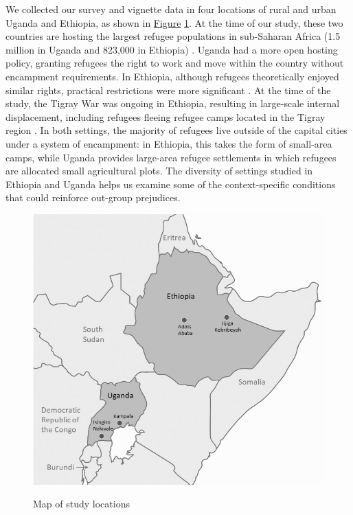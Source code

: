 \documentclass[a4paper,12pt]{article}
\renewcommand{\footnotesize}{\fontsize{8pt}{9pt}\selectfont}
\begin{document}
We collected our survey and vignette data in four locations of rural and urban Uganda and Ethiopia, as shown in \hyperref[fig:map]{Figure} \ref{fig:map}. At the time of our study, these two countries are hosting the largest refugee populations in sub-Saharan Africa (1.5 million in Uganda and 823,000 in Ethiopia) \citep{UNHCRreport2021}. Uganda had a more open hosting policy, granting refugees the right to work and move within the country without encampment requirements. In Ethiopia, although refugees theoretically enjoyed similar rights, practical restrictions were more significant \citep{UNDP2017Uganda, UNHCR2020ecrrp, betts2022states}. At the time of the study, the Tigray War was ongoing in Ethiopia, resulting in large-scale internal displacement, including refugees fleeing refugee camps located in the Tigray region \citep{tsegay2023internal}. In both settings, the majority of refugees live outside of the capital cities under a system of encampment: in Ethiopia, this takes the form of small-area camps, while Uganda provides large-area refugee settlements in which refugees are allocated small agricultural plots. The diversity of settings studied in Ethiopia and Uganda helps us examine some of the context-specific conditions that could reinforce out-group prejudices.

\vspace{5mm}

\begin{figure}[h]
        \footnotesize
        \captionsetup{width=1\linewidth}
        \caption{Map of study locations}
        \label{fig:map}
         \centering
        \includegraphics[height=0.6\textwidth]{Figures/FIG1_Map_Ethiopia_Uganda.jpg} \\
\end{figure} 
\end{document}
